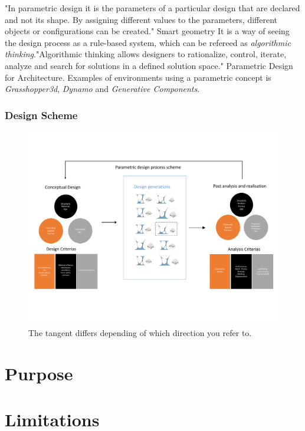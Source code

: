 "In parametric design it is the parameters of a particular design that are declared and not its shape. By assigning different values to the parameters, different objects or configurations can be created." Smart geometry
It is a way of seeing the design process as a rule-based system, which can be refereed as \textit{algorithmic thinking}."Algorithmic thinking allows designers  to rationalize, control, iterate, analyze and search for solutions in a defined solution space." Parametric Design for Architecture.
Examples of environments using a parametric concept is \textit{Grasshopper3d}, \textit{Dynamo} and 
\textit{Generative Components}.

\subsubsection{Design Scheme}

\begin{figure}[H]
\centering
\includegraphics[width=1.0\linewidth ]{figure/Introduction/DesignScheme.pdf}
\caption{The tangent differs depending of which direction you refer to. }
\end{figure}



\section{Purpose} 
\section{Limitations} \label{Section_ref}


